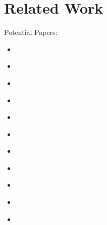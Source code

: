 \chapter{Related Work}\label{ch:rw}

Potential Papers:
\begin{itemize}
	\item \citet{Adner2006}
	\item \citet{Grasl2009}
	\item \citet{Porter2008}
	\item \citet{Cusumano2002}
	\item \citet{Cusumano2010}
	\item \citet{Drucker1994}
	\item \citet{Chesbrough2007}
	\item \citet{Tiwana2010}
	\item \citet{Casadesus-Masanell2010}
	\item \citet{Kiani2009}
	\item \citet{Seelos2007}
\end{itemize}
